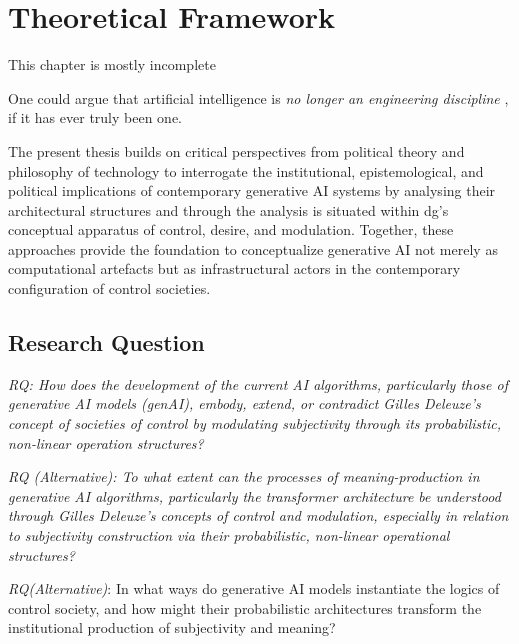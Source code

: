 
\chapter{Theoretical Framework}

\begin{orangebox}
	This chapter is mostly incomplete
\end{orangebox}



One could argue that artificial intelligence is \emph{no longer an engineering discipline} \parencite[206]{dignum2023}, if it has ever truly been one.


The present thesis builds on critical perspectives from political theory and philosophy of technology to interrogate the institutional, epistemological, and political implications of contemporary generative AI systems by analysing their architectural structures and through the analysis is situated within \gls{dg}'s conceptual apparatus of control, desire, and modulation. Together, these approaches provide the foundation to conceptualize generative AI not merely as computational artefacts but as infrastructural actors in the contemporary configuration of control societies.

\section{Research Question}

\begin{center}

	\textit{RQ: How does the development of the current AI algorithms, particularly those of generative AI models (genAI), embody, extend, or contradict Gilles Deleuze’s concept of societies of control by modulating subjectivity through its probabilistic, non-linear operation structures?}

	\textit{RQ (Alternative): To what extent can the processes of meaning-production in generative AI algorithms, particularly the transformer architecture be understood through Gilles Deleuze’s concepts of control and modulation, especially in relation to subjectivity construction via their probabilistic, non-linear operational structures?}

	\textit{RQ(Alternative)}: In what ways do generative AI models instantiate the logics of control society, and how might their probabilistic architectures transform the institutional production of subjectivity and meaning?

\end{center}

